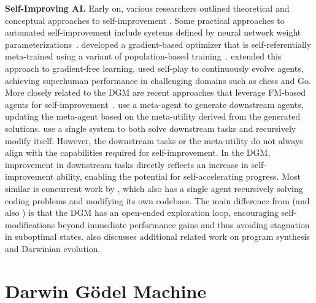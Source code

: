 \documentclass{article} %
\begin{document}
\textbf{Self-Improving AI.}
Early on, various researchers outlined theoretical and conceptual approaches to self-improvement \citep{good1966speculations, schmidhuber1987evolutionary, schmidhuber2007godel}. Some practical approaches to automated self-improvement include systems defined by neural network weight parameterizations~\citep{schmidhuber1993self, hall2007self, hobbhahn2025swebenchmini, kirsch2022self, irie2022modern, irie2025metalearning, lu2023arbitrary, havrilla2024glore}. \citet{metz2021training} developed a gradient-based optimizer that is self-referentially meta-trained using a variant of population-based training~\citep{jaderberg2017population}. \citet{lange2023discovering} extended this approach to gradient-free learning. \citet{silver2017mastering} used self-play to continuously evolve agents, achieving superhuman performance in challenging domains such as chess and Go. More closely related to the DGM are recent approaches that leverage FM-based agents for self-improvement~\citep{yin2024g, robeyns2025self, hu2024self, zelikman2024self, huang2022large, singh2023beyond}. \citet{zelikman2024self} use a meta-agent to generate downstream agents, updating the meta-agent based on the meta-utility derived from the generated solutions. \citet{yin2024g} use a single system to both solve downstream tasks and recursively modify itself. However, the downstream tasks or the meta-utility do not always align with the capabilities required for self-improvement. In the DGM, improvement in downstream tasks directly reflects an increase in self-improvement ability, enabling the potential for self-accelerating progress. Most similar is concurrent work by \citet{robeyns2025self}, which also has a single agent recursively solving coding problems and modifying its own codebase. The main difference from \citet{robeyns2025self} (and also \citet{zelikman2024self, yin2024g}) is that the DGM has an open-ended exploration loop, encouraging self-modifications beyond immediate performance gains and thus avoiding stagnation in suboptimal states.  also discusses additional related work on program synthesis and Darwinian evolution.

\section{Darwin G\"odel Machine}
\label{sec:methods}
\end{document}
